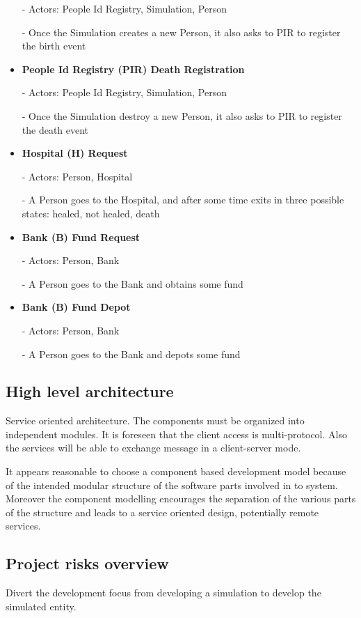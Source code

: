 \begin{itemize}
	- Actors: People Id Registry, Simulation, Person

	- Once the Simulation creates a new Person, it also asks to PIR to register the birth event

  \item \textbf{People Id Registry (PIR) Death Registration}

	- Actors: People Id Registry, Simulation, Person

	- Once the Simulation destroy a new Person, it also asks to PIR to register the death event

  \item \textbf{Hospital (H) Request}

	- Actors: Person, Hospital

	- A Person goes to the Hospital, and after some time exits in three possible states: healed, not healed, death

  \item \textbf{Bank (B) Fund Request}

	- Actors: Person, Bank

	- A Person goes to the Bank and obtains some fund

  \item \textbf{Bank (B) Fund Depot}

	- Actors: Person, Bank

	- A Person goes to the Bank and depots some fund
\end{itemize}


\subsection{High level architecture}
Service oriented architecture. The components must be organized into independent
modules. It is foreseen that the client access is multi-protocol. Also the
services will be able to exchange message in a client-server mode.

It appears reasonable to choose a component based development model because
of the intended modular structure of the software parts involved in to system.
Moreover the component modelling encourages the separation of the various parts
of the structure and leads to a service oriented design, potentially remote
services.

\subsection{Project risks overview}
Divert the development focus from developing a simulation to develop the
simulated entity.
